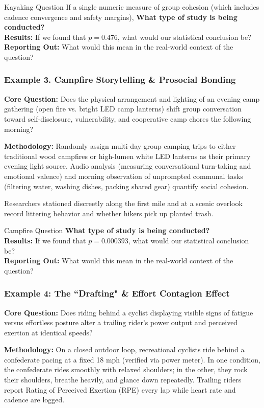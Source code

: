\documentclass{beamer}
\begin{document}
\begin{frame}{Kayaking Question}
If a single numeric measure of group cohesion (which includes cadence convergence and safety margins), \textbf{What type of study is being conducted?}\\[9mm]
\pause
\textbf{Results:} If we found that $p = 0.476$, what would our statistical conclusion be?\\[9mm]
\pause
\textbf{Reporting Out:} What would this mean in the real-world context of the question? 
\vspace{25mm}
\end{frame}

\begin{frame}\frametitle{Example 3. Campfire Storytelling \& Prosocial Bonding}
\textbf{Core Question:} Does the physical arrangement and lighting of an evening camp gathering (open fire vs. bright LED camp lanterns) shift group conversation toward self-disclosure, vulnerability, and cooperative camp chores the following morning?

\pause
\textbf{Methodology:} Randomly assign multi-day group camping trips to either traditional wood campfires or high-lumen white LED lanterns as their primary evening light source. Audio analysis (measuring conversational turn-taking and emotional valence) and morning observation of unprompted communal tasks (filtering water, washing dishes, packing shared gear) quantify social cohesion.

\pause
Researchers stationed discreetly along the first mile and at a scenic overlook record littering behavior and whether hikers pick up planted trash.
\end{frame}

\begin{frame}{Campfire Question}
\textbf{What type of study is being conducted?}\\[9mm]
\pause
\textbf{Results:} If we found that $p = 0.000393$, what would our statistical conclusion be?\\[9mm]
\pause
\textbf{Reporting Out:} What would this mean in the real-world context of the question? 
\vspace{25mm}
\end{frame}

\begin{frame}\frametitle{Example 4: The ``Drafting" \& Effort Contagion Effect}
\textbf{Core Question:} Does riding behind a cyclist displaying visible signs of fatigue versus effortless posture alter a trailing rider’s power output and perceived exertion at identical speeds?

\pause
\textbf{Methodology:} On a closed outdoor loop, recreational cyclists ride behind a confederate pacing at a fixed 18 mph (verified via power meter). In one condition, the confederate rides smoothly with relaxed shoulders; in the other, they rock their shoulders, breathe heavily, and glance down repeatedly. Trailing riders report Rating of Perceived Exertion (RPE) every lap while heart rate and cadence are logged.
\vspace{15mm}
\end{frame}
\end{document}
